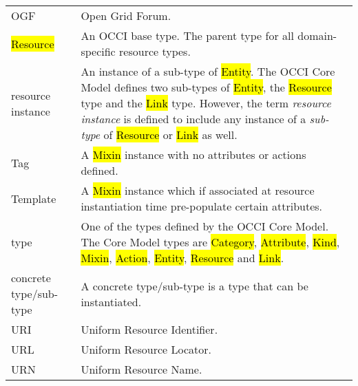 \begin{tabular}{l|p{12cm}}
OGF & Open Grid Forum. \\

\hl{Resource} & An OCCI base type. The parent type for all domain-specific resource types. \\

resource instance & An instance of a sub-type of \hl{Entity}. The OCCI
 Core Model defines two sub-types of \hl{Entity}, the \hl{Resource} type and the
 \hl{Link} type. However, the term {\em resource instance} is defined to
 include any instance of a {\em sub-type} of \hl{Resource} or \hl{Link} as
 well. \\

Tag & A \hl{Mixin} instance with no attributes or actions defined. \\

Template & A \hl{Mixin} instance which if associated at resource instantiation
time pre-populate certain attributes. \\

type & One of the types defined by the OCCI Core Model.  The Core Model types are
 \hl{Category}, \hl{Attribute},
 \hl{Kind}, \hl{Mixin}, \hl{Action}, \hl{Entity}, \hl{Resource}
 and \hl{Link}. \\
 
concrete type/sub-type & A concrete type/sub-type is a type that can be instantiated.\\

URI & Uniform Resource Identifier. \\
URL & Uniform Resource Locator. \\
URN & Uniform Resource Name. \\
\end{tabular}
